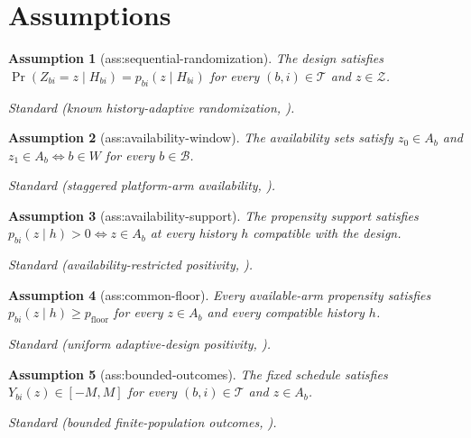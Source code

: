 \documentclass{article}
\newtheorem{assumption}{Assumption}
\begin{document}
\section{Assumptions}

\begin{assumption}[ass:sequential-randomization]\label{ass:sequential-randomization}
The design satisfies \(\Pr(Z_{bi}=z\mid H_{bi})=p_{bi}(z\mid H_{bi})\) for every \((b,i)\in\mathcal T\) and \(z\in\mathcal Z\).
\par\smallskip\noindent\emph{Standard} (known history-adaptive randomization, \cite{LiZhao2026}).
\end{assumption}

\begin{assumption}[ass:availability-window]\label{ass:availability-window}
The availability sets satisfy \(z_0\in A_b\) and \(z_1\in A_b\Longleftrightarrow b\in W\) for every \(b\in\mathcal B\).
\par\smallskip\noindent\emph{Standard} (staggered platform-arm availability, \cite{BofillRoigEtAl2023Scoping}).
\end{assumption}

\begin{assumption}[ass:availability-support]\label{ass:availability-support}
The propensity support satisfies \(p_{bi}(z\mid h)>0\Longleftrightarrow z\in A_b\) at every history \(h\) compatible with the design.
\par\smallskip\noindent\emph{Standard} (availability-restricted positivity, \cite{SantacatterinaMacchiavelliGironZhangDiaz2025}).
\end{assumption}

\begin{assumption}[ass:common-floor]\label{ass:common-floor}
Every available-arm propensity satisfies \(p_{bi}(z\mid h)\ge p_{\mathrm{floor}}\) for every \(z\in A_b\) and every compatible history \(h\).
\par\smallskip\noindent\emph{Standard} (uniform adaptive-design positivity, \cite{LiZhao2026}).
\end{assumption}

\begin{assumption}[ass:bounded-outcomes]\label{ass:bounded-outcomes}
The fixed schedule satisfies \(Y_{bi}(z)\in[-M,M]\) for every \((b,i)\in\mathcal T\) and \(z\in A_b\).
\par\smallskip\noindent\emph{Standard} (bounded finite-population outcomes, \cite{HamBojinovLindonTingley2023Bandits}).
\end{assumption}
\end{document}
